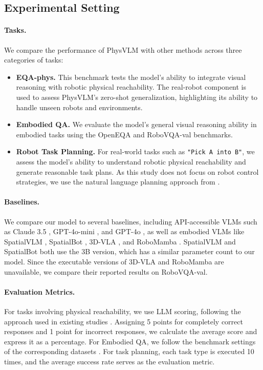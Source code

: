 \documentclass[10pt,twocolumn,letterpaper]{article}
\begin{document}
\subsection{Experimental Setting}

\paragraph{Tasks.}
We compare the performance of PhysVLM with other methods across three categories of tasks:

\begin{itemize}
\item \textbf{EQA-phys.} This benchmark tests the model's ability to integrate visual reasoning with robotic physical reachability. The real-robot component is used to assess PhysVLM's zero-shot generalization, highlighting its ability to handle unseen robots and environments.
\item \textbf{Embodied QA.} We evaluate the model's general visual reasoning ability in embodied tasks using the OpenEQA \cite{openeqa} and RoboVQA-val \cite{robovqa} benchmarks.
\item \textbf{Robot Task Planning.} For real-world tasks such as \texttt{"Pick A into B"}, we assess the model's ability to understand robotic physical reachability and generate reasonable task plans. As this study does not focus on robot control strategies, we use the natural language planning approach from \cite{robovqa}.
\end{itemize}



\paragraph{Baselines.}
We compare our model to several baselines, including API-accessible VLMs such as Claude 3.5 \cite{claude3}, GPT-4o-mini \cite{gpt4}, and GPT-4o \cite{gpt4}, as well as embodied VLMs like SpatialVLM \cite{spatialvlm}, SpatialBot \cite{spatialbot}, 3D-VLA \cite{3dvla}, and RoboMamba \cite{robomamba}. SpatialVLM and SpatialBot both use the 3B version, which has a similar parameter count to our model. Since the executable versions of 3D-VLA and RoboMamba are unavailable, we compare their reported results on RoboVQA-val.

\paragraph{Evaluation Metrics.}
For tasks involving physical reachability, we use LLM scoring, following the approach used in existing studies \cite{openeqa, mmbench}. Assigning 5 points for completely correct responses and 1 point for incorrect responses, we calculate the average score and express it as a percentage. For Embodied QA, we follow the benchmark settings of the corresponding datasets \cite{openeqa, robovqa}. For task planning, each task type is executed 10 times, and the average success rate serves as the evaluation metric.
\end{document}
